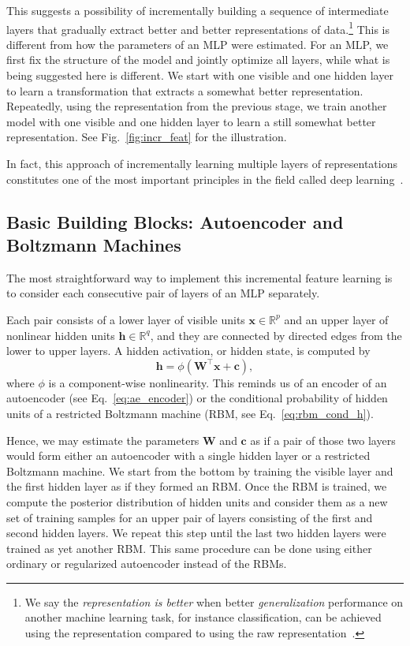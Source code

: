\documentclass{now}
\newcommand{\vect}[1]{\mathbf{#1}}
\newcommand{\matr}[1]{\mathbf{#1}}
\newcommand{\vc}[0]{\vect{c}}
\newcommand{\vh}[0]{\vect{h}}
\newcommand{\vx}[0]{\vect{x}}
\newcommand{\mW}[0]{\matr{W}}
\newcommand{\RR}[0]{\mathbb{R}}
\begin{document}
This suggests a possibility of incrementally building a sequence of intermediate
layers that gradually extract better and better representations of
data.\footnote{
    We say the \textit{representation is better} when better
    \textit{generalization} performance on another machine learning task, for
    instance classification, can be achieved using the representation compared
    to using the raw representation~\citep{Bengio2007nips}.
} 
This is different from how the parameters of an MLP were estimated. For an MLP,
we first fix the structure of the model and jointly optimize all layers, while
what is being suggested here is different. We start with one visible and one
hidden layer to learn a transformation that extracts a somewhat better
representation. Repeatedly, using the representation from the previous stage, we
train another model with one visible and one hidden layer to learn a still
somewhat better representation. See Fig.~\ref{fig:incr_feat} for the
illustration.

In fact, this approach of incrementally learning multiple layers of
representations constitutes one of the most important principles in the field
called deep learning~\citep[see, e.g.,][]{Bengio2009a}.

\subsection{Basic Building Blocks: Autoencoder and Boltzmann Machines}
\label{sec:basic_blocks1}

The most straightforward way to implement this incremental feature learning is
to consider each consecutive pair of layers of an MLP separately. 

Each pair consists of a lower layer of visible units $\vx \in \RR^p$ and an
upper layer of nonlinear hidden units $\vh \in \RR^q$, and they are connected by
directed edges from the lower to upper layers. A hidden activation, or hidden
state, is computed by 
\[
\vh = \phi\left( \mW^\top \vx + \vc \right),
\]
where $\phi$ is a component-wise nonlinearity.  This reminds us of an encoder of
an autoencoder (see Eq.~\eqref{eq:ae_encoder}) or the conditional probability of
hidden units of a restricted Boltzmann machine (RBM, see
Eq.~\eqref{eq:rbm_cond_h}).

Hence, we may estimate the parameters $\mW$ and $\vc$ as if a pair of those two
layers would form either an autoencoder with a single hidden layer or a
restricted Boltzmann machine. We start from the bottom by training the visible
layer and the first hidden layer as if they formed an RBM. Once the RBM is
trained, we compute the posterior distribution of hidden units and consider them
as a new set of training samples for an upper pair of layers consisting of the
first and second hidden layers. We repeat this step until the last two hidden
layers were trained as yet another RBM. This same procedure can be done using
either ordinary or regularized autoencoder instead of the RBMs.
\end{document}
